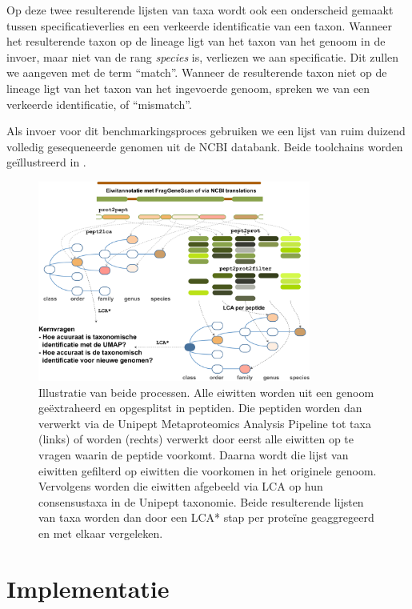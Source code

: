 Op deze twee resulterende lijsten van taxa wordt ook een onderscheid gemaakt
tussen specificatieverlies en een verkeerde identificatie van een taxon. Wanneer
het resulterende taxon op de lineage ligt van het taxon van het genoom in de
invoer, maar niet van de rang \textit{species} is, verliezen we aan
specificatie. Dit zullen we aangeven met de term ``match''. Wanneer de
resulterende taxon niet op de lineage ligt van het taxon van het ingevoerde
genoom, spreken we van een verkeerde identificatie, of ``mismatch''.

Als invoer voor dit benchmarkingsproces gebruiken we een lijst van ruim duizend
volledig gesequeneerde genomen uit de NCBI databank. Beide toolchains worden
geïllustreerd in .

\begin{figure}
	\centering
	\includegraphics[width=0.8\textwidth]{includes/abstractimage.pdf}
	\caption{Illustratie van beide processen. Alle eiwitten worden uit een 
	genoom geëxtraheerd en opgesplitst in peptiden. Die peptiden worden dan 
	verwerkt via de Unipept Metaproteomics Analysis Pipeline tot taxa (links) 
	of worden (rechts) verwerkt door eerst alle eiwitten op te vragen waarin 
	de peptide voorkomt. Daarna wordt die lijst van eiwitten gefilterd op 
	eiwitten die voorkomen in het originele genoom. Vervolgens worden die 
	eiwitten afgebeeld via LCA op hun consensustaxa in de Unipept taxonomie. 
	Beide resulterende lijsten van taxa worden dan door een LCA* stap per 
	proteïne geaggregeerd en met elkaar vergeleken.}
	\label{fig:abstractimage}
\end{figure}

\section{Implementatie} 


